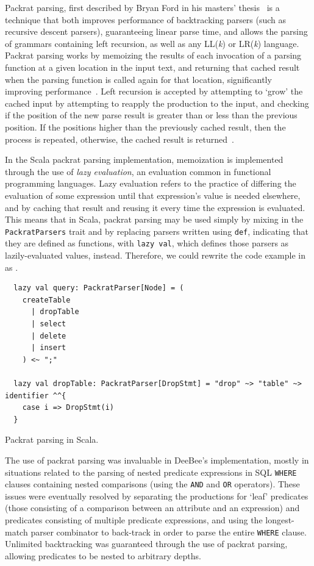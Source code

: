 Packrat parsing, first described by Bryan Ford in his masters' thesis~\cite{ford2002packrat} is a technique that both improves performance of backtracking parsers (such as recursive descent parsers), guaranteeing linear parse time, and allows the parsing of grammars containing left recursion, as well as any LL(\textit{k}) or LR(\textit{k}) language. Packrat parsing works by memoizing the results of each invocation of a parsing function at a given location in the input text, and returning that cached result when the parsing function is called again for that location, significantly improving performance~\cite{jonnalagedda2009packrat,ford2002packrat,ford2002packrat2}. Left recursion is accepted by attempting to `grow' the cached input by attempting to reapply the production to the input, and checking if the position of the new parse result is greater than or less than the previous position. If the positions higher than the previously cached result, then the process is repeated, otherwise, the cached result is returned~\cite{jonnalagedda2009packrat,ford2002packrat}.

In the Scala packrat parsing implementation, memoization is implemented through the use of \textit{lazy evaluation}, an evaluation common in functional programming languages. Lazy evaluation refers to the practice of differing the evaluation of some expression until that expression's value is needed elsewhere, and by caching that result and reusing it every time the expression is evaluated. This means that in Scala, packrat parsing may be used simply by mixing in the \texttt{PackratParsers} trait and by replacing parsers written using \texttt{def}, indicating that they are defined as functions, with \texttt{lazy val}, which defines those parsers as lazily-evaluated values, instead. Therefore, we could rewrite the code example in  as .
\begin{listing}[h]
    \begin{verbatim}
  lazy val query: PackratParser[Node] = (
    createTable
      | dropTable
      | select
      | delete
      | insert
    ) <~ ";"
    
  lazy val dropTable: PackratParser[DropStmt] = "drop" ~> "table" ~> identifier ^^{
    case i => DropStmt(i)
  }
    \end{verbatim}
    \caption{Packrat parsing in Scala.}
    \label{lst:packrat1}
\end{listing}
\FloatBarrier
The use of packrat parsing was invaluable in DeeBee's implementation, mostly in situations related to the parsing of nested predicate expressions in SQL \texttt{WHERE} clauses containing nested comparisons (using the \texttt{AND} and \texttt{OR} operators). These issues were eventually resolved by separating the productions for `leaf' predicates (those consisting of a comparison between an attribute and an expression) and predicates consisting of multiple predicate expressions, and using the longest-match parser combinator to back-track in order to parse the entire \texttt{WHERE} clause. Unlimited backtracking was guaranteed through the use of packrat parsing, allowing predicates to be nested to arbitrary depths.
\FloatBarrier
